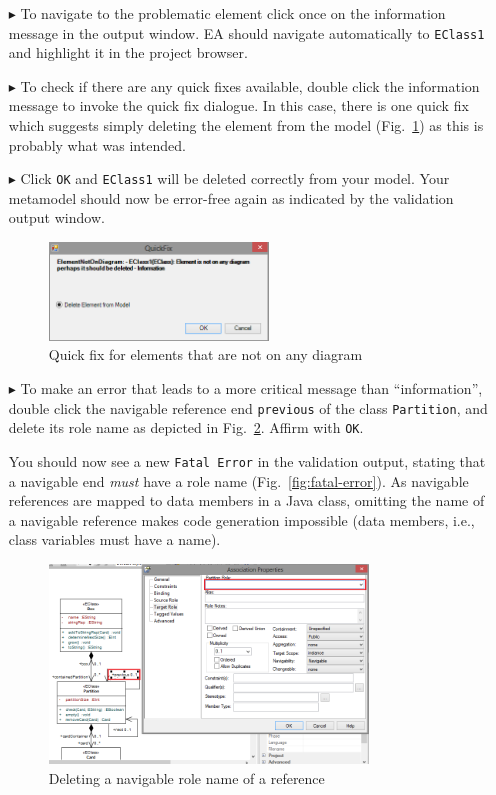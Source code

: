 \begin{enumerate}
\item[$\blacktriangleright$] To navigate to the problematic element click once on the information message in the output window.
EA should navigate automatically to \texttt{EClass1} and highlight it in the project browser.
\item[$\blacktriangleright$] To check if there are any quick fixes available, double click the information message to invoke the quick fix dialogue.
In this case, there is one quick fix which suggests simply deleting the element from the model (Fig.~\ref{fig:quick-fix1}) as this is probably what was intended.
\item[$\blacktriangleright$] Click \texttt{OK} and \texttt{EClass1} will be deleted correctly from your model.
Your metamodel should now be error-free again as indicated by the validation output window.

\begin{figure}[htbp]
	\centering
  \includegraphics[width=0.55\textwidth]{pics/memBoxBilder/memBox45}
	\caption{Quick fix for elements that are not on any diagram}
	\label{fig:quick-fix1}
\end{figure}
\FloatBarrier

\item[$\blacktriangleright$] To make an error that leads to a more critical message than ``information'',
double click the navigable reference end \texttt{previous} of the class \texttt{Partition}, and delete its role name as depicted in Fig.~\ref{fig:delete-role-name}.
Affirm with \texttt{OK}.

You should now see a new \texttt{Fatal Error} in the validation output, stating that a navigable end \emph{must} have a role name (Fig.~\ref{fig:fatal-error}).
As navigable references are mapped to data members in a Java class, omitting the name of a navigable reference makes code generation impossible (data members, i.e., class variables must have a name).

\begin{figure}[htbp]
    \centering
  \includegraphics[width=0.8\textwidth]{pics/memBoxBilder/memBox46}
    \caption{Deleting a navigable role name of a reference}
    \label{fig:delete-role-name}
\end{figure}


\end{enumerate}
